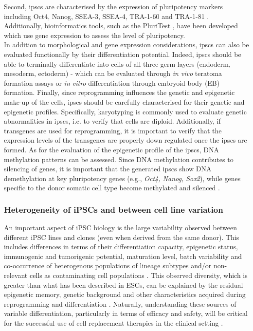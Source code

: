 Second, \glspl{ipsc} are characterised by the expression of pluripotency markers including Oct4, Nanog, SSEA-3, SSEA-4, TRA-1-60 and TRA-1-81 \cite{boulting2011functionally}.
Additionally, bioinformatics tools, such as the PluriTest \cite{muller2011bioinformatic}, have been developed which use gene expression to assess the level of pluripotency. \\

In addition to morphological and gene expression considerations, \glspl{ipsc} can also be evaluated functionally by their differentiation potential.
Indeed, \glspl{ipsc} should be able to terminally differentiate into cells of all three germ layers (endoderm, mesoderm, ectoderm) - which can be evaluated through \textit{in vivo} teratoma formation assays or \textit{in vitro} differentiation through embryoid body (EB) formation.
Finally, since reprogramming influences the genetic and epigenetic make-up of the cells, \glspl{ipsc} should be carefully characterised for their genetic and epigenetic profiles.
Specifically, karyotyping is commonly used to evaluate genetic abnormalities in \glspl{ipsc}, i.e. to verify that cells are diploid. 
Additionally, if transgenes are used for reprogramming, it is important to verify that the expression levels of the transgenes are properly down regulated once the \glspl{ipsc} are formed. 
As for the evaluation of the epigenetic profile of the \glspl{ipsc}, DNA methylation patterns can be assessed. 
Since DNA methylation contributes to silencing of genes, it is important that the generated \glspl{ipsc} show DNA demethylation at key pluripotency genes (e.g., \textit{Oct4, Nanog, Sox2}), while genes specific to the donor somatic cell type become methylated and silenced \cite{brouwer2016choices, omole2018ten}. 

\subsubsection{Heterogeneity of iPSCs and between cell line variation}

An important aspect of iPSC biology is the  large variability observed between different iPSC lines and clones (even when derived from the same donor). 
This includes differences in terms of their differentiation capacity, epigenetic status, immunogenic and tumorigenic potential, maturation level, batch variability and co-occurrence of heterogenous populations of lineage subtypes and/or non-relevant cells as contaminating cell populations \cite{buganim2013mechanisms}.
This observed diversity, which is greater than what has been described in ESCs, can be explained by the residual epigenetic memory, genetic background and other characteristics acquired during reprogramming and differentiation \cite{kim2010epigenetic, polo2010cell, rouhani2014genetic}.
Naturally, understanding these sources of variable differentiation, particularly in terms of efficacy and safety, will be critical for the successful use of cell replacement therapies in the clinical setting \cite{buganim2013mechanisms}. \\

